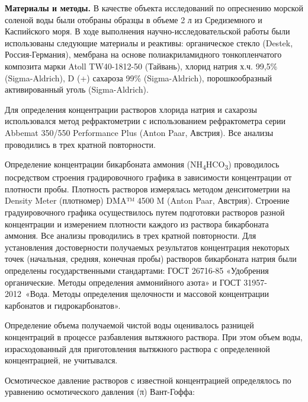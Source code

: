 {\bfseries Материалы и методы.} В качестве объекта исследований по
опреснению морской соленой воды были отобраны образцы в объеме 2 л из
Средиземного и Каспийского моря. В ходе выполнения
научно-исследовательской работы были использованы следующие материалы и
реактивы: органическое стекло (Destek, Россия-Германия), мембрана на
основе полиакриламидного тонкопленчатого композита марки Atoll
TW40-1812-50 (Тайвань), хлорид натрия х.ч. 99,5\% (Sigma-Aldrich), D (+)
сахароза 99\% (Sigma-Aldrich), порошкообразный активированный уголь
(Sigma-Aldrich).

Для определения концентрации растворов хлорида натрия и сахарозы
использовался метод рефрактометрии с использованием рефрактометра серии
Abbemat 350/550 Performance Plus (Anton Paar, Австрия). Все анализы
проводились в трех кратной повторности.

Определение концентрации бикарбоната аммония
(NH\textsubscript{4}HCO\textsubscript{3}) проводилось посредством
строения градировочного графика в зависимости концентрации от плотности
пробы. Плотность растворов измерялась методом денситометрии на Density
Meter (плотномер) DMA™ 4500 M (Anton Paar, Австрия). Строение
градуировочного графика осуществилось путем подготовки растворов разной
концентрации и измерением плотности каждого из раствора бикарбоната
аммония. Все анализы проводились в трех кратной повторности. Для
установления достоверности получаемых результатов концентрация некоторых
точек (начальная, средняя, конечная пробы) растворов бикарбоната натрия
были определены государственными стандартами: ГОСТ 26716-85 «Удобрения
органические. Методы определения аммонийного азота» и ГОСТ
31957-2012~«Вода. Методы определения щелочности и массовой концентрации
карбонатов и гидрокарбонатов».

Определение объема получаемой чистой воды оценивалось разницей
концентраций в процессе разбавления вытяжного раствора. При этом объем
воды, израсходованный для приготовления вытяжного раствора с
определенной концентрацией, не учитывался.

Осмотическое давление растворов с известной концентрацией определялось
по уравнению осмотического давления (π) Вант-Гоффа:


